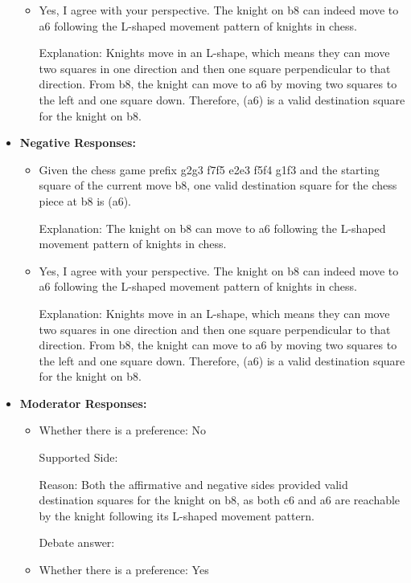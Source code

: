\begin{tcolorbox}[breakable]
\begin{itemize}
\begin{itemize}
        \item Yes, I agree with your perspective. The knight on b8 can indeed move to a6 following the L-shaped movement pattern of knights in chess.
        
        Explanation: Knights move in an L-shape, which means they can move two squares in one direction and then one square perpendicular to that direction. From b8, the knight can move to a6 by moving two squares to the left and one square down. Therefore, (a6) is a valid destination square for the knight on b8.
    \end{itemize}

    \item \textbf{Negative Responses:}
    \begin{itemize}
        \item Given the chess game prefix g2g3 f7f5 e2e3 f5f4 g1f3 and the starting square of the current move b8, one valid destination square for the chess piece at b8 is (a6).
        
        Explanation: The knight on b8 can move to a6 following the L-shaped movement pattern of knights in chess.
        
        \item Yes, I agree with your perspective. The knight on b8 can indeed move to a6 following the L-shaped movement pattern of knights in chess.
        
        Explanation: Knights move in an L-shape, which means they can move two squares in one direction and then one square perpendicular to that direction. From b8, the knight can move to a6 by moving two squares to the left and one square down. Therefore, (a6) is a valid destination square for the knight on b8.
    \end{itemize}

    \item \textbf{Moderator Responses:}
    \begin{itemize}
        \item Whether there is a preference: No
        
        Supported Side: 
        
        Reason: Both the affirmative and negative sides provided valid destination squares for the knight on b8, as both c6 and a6 are reachable by the knight following its L-shaped movement pattern.
        
        Debate answer: 
        
        \item Whether there is a preference: Yes
        

\end{itemize}
\end{itemize}
\end{tcolorbox}
